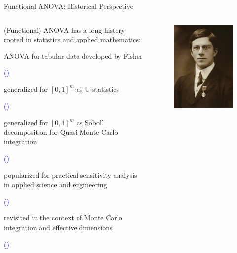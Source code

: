 \documentclass[english,aspectratio=169]{beamer}
\let\tempone\itemize
\let\temptwo\enditemize
\renewenvironment{itemize}{\tempone\addtolength{\itemsep}{0.35\baselineskip}}{\temptwo}
\begin{document}
\begin{frame}[fragile]{Functional ANOVA: Historical Perspective}
\small

\begin{columns}[T,onlytextwidth]
  \begin{column}{0.60\textwidth}

  (Functional) ANOVA has a long history rooted in statistics and applied mathematics:
  \vspace{0.5em}
  \begin{itemize}
    \item ANOVA for tabular data developed by Fisher \\
    {\hfill \raggedright \tiny \textcolor{blue}{(\cite{Fisher1919})}}
    \item generalized for $[0, 1]^m$ as U-statistics \\
    {\hfill \raggedright \tiny \textcolor{blue}{(\cite{Hoeffding1948})}}
    \item generalized for $[0, 1]^m$ as Sobol' decomposition for Quasi Monte Carlo integration \\
    {\hfill \raggedright \tiny \textcolor{blue}{(\cite{Sobol1969})}}
    \item popularized for practical sensitivity analysis in applied science and engineering\\
    {\hfill \raggedright \tiny \textcolor{blue}{(\cite{Saltelli2000})}}
    \item revisited in the context of Monte Carlo integration and effective dimensions\\
    {\hfill \raggedright \tiny \textcolor{blue}{(\cite{Caflisch1997,Liu2006})}}
  \end{itemize}
  \end{column}
  \begin{column}{0.40\textwidth}
    \begin{figure}[ht] 
      \begin{minipage}[b]{0.3\linewidth}
        \centering
        \includegraphics[height=.3\textheight]{./figures/fisher}\par 

\end{minipage}
\end{figure}
\end{column}
\end{columns}
\end{frame}
\end{document}
